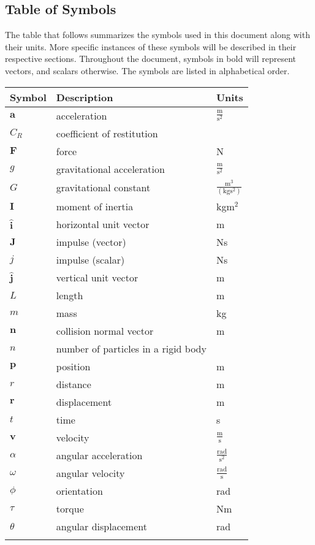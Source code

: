 \documentclass[12pt]{article}
\begin{document}
\subsection{Table of Symbols}
\label{Sec:ToS}
The table that follows summarizes the symbols used in this document along with their units.  More specific instances of these symbols will be described in their respective sections. Throughout the document, symbols in bold will represent vectors, and scalars otherwise. The symbols are listed in alphabetical order.
\begin{longtable*}{l l l}
\toprule
Symbol & Description & Units
\\
\midrule
$\mathbf{a}$ & acceleration & $\frac{\text{m}}{\text{s}^{2}}$
\\
$C_{R}$ & coefficient of restitution & 
\\
$\mathbf{F}$ & force & N
\\
$g$ & gravitational acceleration & $\frac{\text{m}}{\text{s}^{2}}$
\\
$G$ & gravitational constant & $\frac{\text{m}^{3}}{(\text{kg}\text{s}^{2})}$
\\
$\mathbf{I}$ & moment of inertia & kg$\text{m}^{2}$
\\
$\mathbf{\hat{i}}$ & horizontal unit vector & m
\\
$\mathbf{J}$ & impulse (vector) & Ns
\\
$j$ & impulse (scalar) & Ns
\\
$\mathbf{\hat{j}}$ & vertical unit vector & m
\\
$L$ & length & m
\\
$m$ & mass & kg
\\
$\mathbf{n}$ & collision normal vector & m
\\
$n$ & number of particles in a rigid body & 
\\
$\mathbf{p}$ & position & m
\\
$r$ & distance & m
\\
$\mathbf{r}$ & displacement & m
\\
$t$ & time & s
\\
$\mathbf{v}$ & velocity & $\frac{\text{m}}{\text{s}}$
\\
$\alpha{}$ & angular acceleration & $\frac{\text{rad}}{\text{s}^{2}}$
\\
$\omega{}$ & angular velocity & $\frac{\text{rad}}{\text{s}}$
\\
$\phi{}$ & orientation & rad
\\
$\tau{}$ & torque & Nm
\\
$\theta{}$ & angular displacement & rad
\\
\bottomrule
\label{Table:ToS}
\end{longtable*}
\end{document}
